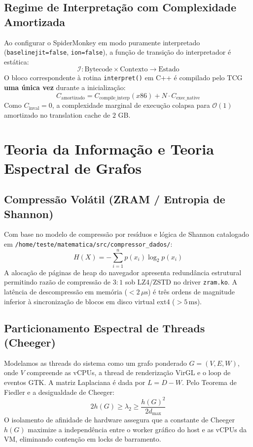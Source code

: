 \documentclass[10pt,twocolumn]{article}
\begin{document}
\subsection{Regime de Interpreta\c{c}\~ao com Complexidade Amortizada}
Ao configurar o SpiderMonkey em modo puramente interpretado (\texttt{baselinejit=false}, \texttt{ion=false}), a fun\c{c}\~ao de transi\c{c}\~ao do interpretador \'e est\'atica:
\begin{equation}
\mathcal{I}: \text{Bytecode} \times \text{Contexto} \to \text{Estado}
\end{equation}
O bloco correspondente \`a rotina \texttt{interpret()} em C++ \'e compilado pelo TCG \textbf{uma \'unica vez} durante a inicializa\c{c}\~ao:
\begin{equation}
C_{\text{amortizado}} = C_{\text{compile\_interp}}(x86) + N \cdot C_{\text{exec\_native}}
\end{equation}
Como $C_{\text{inval}} = 0$, a complexidade marginal de execu\c{c}\~ao colapsa para $\mathcal{O}(1)$ amortizado no translation cache de $2$ GB.

\section{Teoria da Informa\c{c}\~ao e Teoria Espectral de Grafos}

\subsection{Compress\~ao Vol\'atil (ZRAM / Entropia de Shannon)}
Com base no modelo de compress\~ao por res\'iduos e l\'ogica de Shannon catalogado em \texttt{/home/teste/matematica/src/compressor\_dados/}:
\begin{equation}
H(X) = -\sum_{i=1}^n p(x_i) \log_2 p(x_i)
\end{equation}
A aloca\c{c}\~ao de p\'aginas de heap do navegador apresenta redund\^ancia estrutural permitindo raz\~ao de compress\~ao de $3:1$ sob LZ4/ZSTD no driver \texttt{zram.ko}. A lat\^encia de descompress\~ao em mem\'oria ($< 2\,\mu\text{s}$) \'e tr\^es ordens de magnitude inferior \`a sincroniza\c{c}\~ao de blocos em disco virtual ext4 ($> 5\,\text{ms}$).

\subsection{Particionamento Espectral de Threads (Cheeger)}
Modelamos as threads do sistema como um grafo ponderado $G = (V, E, W)$, onde $V$ compreende as vCPUs, a thread de renderiza\c{c}\~ao VirGL e o loop de eventos GTK. A matriz Laplaciana \'e dada por $L = D - W$.
Pelo Teorema de Fiedler e a desigualdade de Cheeger:
\begin{equation}
2 h(G) \ge \lambda_2 \ge \frac{h(G)^2}{2 d_{\max}}
\end{equation}
O isolamento de afinidade de hardware assegura que a constante de Cheeger $h(G)$ maximize a independ\^encia entre o worker gr\'afico do host e as vCPUs da VM, eliminando conten\c{c}\~ao em locks de barramento.
\end{document}
